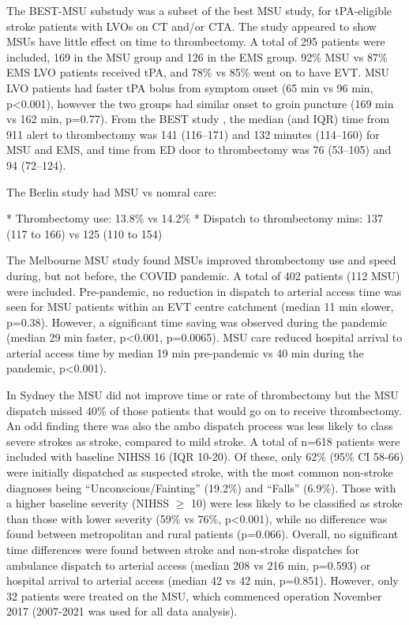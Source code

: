 The BEST-MSU substudy \cite{czap_abstract_2022} was a subset of the best MSU study, for tPA-eligible stroke patients with LVOs on CT and/or CTA. The study appeared to show MSUs have little effect on time to thrombectomy. A total of 295 patients were included, 169 in the MSU group and 126 in the EMS group. 92\% MSU vs 87\% EMS LVO patients received tPA, and 78\% vs 85\% went on to have EVT. MSU LVO patients had faster tPA bolus from symptom onset (65 min vs 96 min, p<0.001), however the two groups had similar onset to groin puncture (169 min vs 162 min, p=0.77). From the BEST study \cite{grotta_prospective_2021}, the median (and IQR) time from 911 alert to  thrombectomy was 141 (116–171) and 132 minutes (114–160) for MSU and EMS, and  time from ED door to thrombectomy was 76 (53–105) and 94 (72–124).

The Berlin study \cite{ebinger_association_2021} had MSU vs nomral care:

* Thrombectomy use: 13.8\% vs 14.2\%
* Dispatch to thrombectomy mins: 137 (117 to 166) vs 125 (110 to 154)


The Melbourne MSU study \cite{menezes_abstract_2023} found MSUs improved thrombectomy use and speed during, but not before, the COVID pandemic. A total of 402 patients (112 MSU) were included. Pre-pandemic, no reduction in dispatch to arterial access time was seen for MSU patients within an EVT centre catchment (median 11 min slower, p=0.38). However, a significant time saving was observed during the pandemic (median 29 min faster, p<0.001, p=0.0065). MSU care reduced hospital arrival to arterial access time by median 19 min pre-pandemic vs 40 min during the pandemic, p<0.001).

In Sydney the MSU did not improve time or rate of thrombectomy \cite{haliem_abstract_2023} but the MSU dispatch missed 40\% of those patients that would go on to receive thrombectomy. An odd finding there was also the ambo dispatch process was less likely to class severe strokes as stroke, compared to mild stroke. A total of n=618 patients were included with baseline NIHSS 16 (IQR 10-20). Of these, only 62\% (95\% CI 58-66) were initially dispatched as suspected stroke, with the most common non-stroke diagnoses being “Unconscious/Fainting” (19.2\%) and “Falls” (6.9\%). Those with a higher baseline severity (NIHSS $\ge$ 10) were less likely to be classified as stroke than those with lower severity (59\% vs 76\%, p<0.001), while no difference was found between metropolitan and rural patients (p=0.066). Overall, no significant time differences were found between stroke and non-stroke dispatches for ambulance dispatch to arterial access (median 208 vs 216 min, p=0.593) or hospital arrival to arterial access (median 42 vs 42 min, p=0.851). However, only 32 patients were treated on the MSU, which commenced operation November 2017 (2007-2021 was used for all data analysis). 

